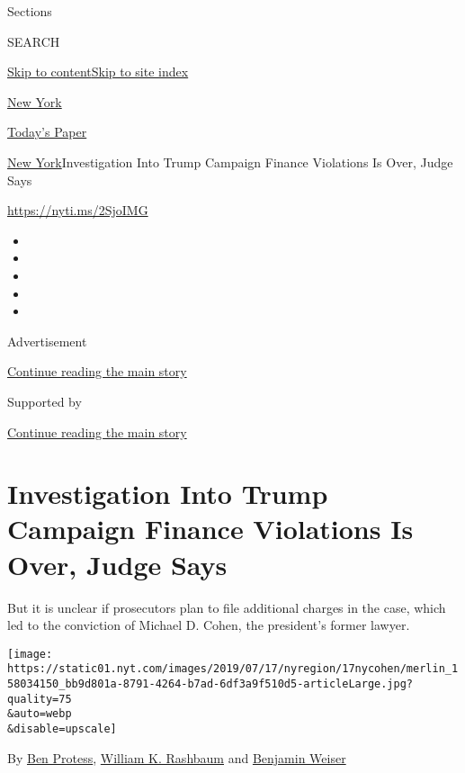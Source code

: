 Sections

SEARCH

\protect\hyperlink{site-content}{Skip to
content}\protect\hyperlink{site-index}{Skip to site index}

\href{https://www.nytimes.com/section/nyregion}{New York}

\href{https://myaccount.nytimes.com/auth/login?response_type=cookie\&client_id=vi}{}

\href{https://www.nytimes.com/section/todayspaper}{Today's Paper}

\href{/section/nyregion}{New York}\textbar{}Investigation Into Trump
Campaign Finance Violations Is Over, Judge Says

\url{https://nyti.ms/2SjoIMG}

\begin{itemize}
\item
\item
\item
\item
\item
\end{itemize}

Advertisement

\protect\hyperlink{after-top}{Continue reading the main story}

Supported by

\protect\hyperlink{after-sponsor}{Continue reading the main story}

\hypertarget{investigation-into-trump-campaign-finance-violations-is-over-judge-says}{%
\section{Investigation Into Trump Campaign Finance Violations Is Over,
Judge
Says}\label{investigation-into-trump-campaign-finance-violations-is-over-judge-says}}

But it is unclear if prosecutors plan to file additional charges in the
case, which led to the conviction of Michael D. Cohen, the president's
former lawyer.

\texttt{[image: https://static01.nyt.com/images/2019/07/17/nyregion/17nycohen/merlin\_158034150\_bb9d801a-8791-4264-b7ad-6df3a9f510d5-articleLarge.jpg?quality=75\\\&auto=webp\\\&disable=upscale]}

By \href{https://www.nytimes.com/by/ben-protess}{Ben Protess},
\href{https://www.nytimes.com/by/william-k-rashbaum}{William K.
Rashbaum} and \href{https://www.nytimes.com/by/benjamin-weiser}{Benjamin
Weiser}

